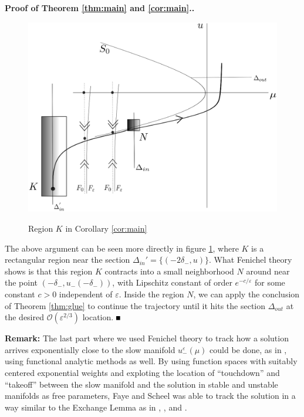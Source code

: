 \documentclass[letterpaper,11pt]{article}
\newcommand{\rmO}{\mathcal{O}}
\newcommand{\eps}{\varepsilon}
\numberwithin{equation}{section}
\theoremstyle{plain}
\newenvironment{Proof}[1][\unskip]%
 {\begin{trivlist} \item[]{\bf Proof #1. }}%
 {\hspace*{\fill}$\rule{.4\baselineskip}{.4\baselineskip}$\end{trivlist}}
\begin{document}
\begin{Proof}[\textbf{ of Theorem \ref{thm:main} and \ref{cor:main}}.]
\begin{figure}[ht]
 \centering %
 \scalebox{0.6} %
 {\includegraphics[angle = 0, origin = c]{figures/contraction_Fenichel.eps}} %
 \caption{Region $K$ in Corollary \ref{cor:main}}\label{fig:contraction_Fenichel} 
\end{figure}

The above argument can be seen more directly in figure \ref{fig:contraction_Fenichel}, where $K$ is a rectangular region near the section $\Delta_{in}'=\{(-2\delta_-,u)\}$. What Fenichel theory shows is that this region $K$ contracts into a small neighborhood $N$ around near the point $(-\delta_-, u_-(-\delta_-))$, with Lipschitz constant of order $e^{-c/\eps}$ for some constant $c>0$ independent of $\eps$. Inside the region $N$, we can apply the conclusion of Theorem \ref{thm:glue} to continue the trajectory until it hits the section $\Delta_{out}$ at the desired $\rmO(\eps^{2/3})$ location. 
\end{Proof}

\textbf{Remark:} The last part where we used Fenichel theory to track how a solution arrives exponentially close to the slow manifold $u_-^\eps(\mu)$ could be done, as in \cite{faye2015existence}, using functional analytic methods as well. By using function spaces with suitably centered exponential weights and exploting the location of ``touchdown'' and ``takeoff'' between the slow manifold and the solution in stable and unstable manifolds as free parameters, Faye and Scheel was able to track the solution in a way similar to the Exchange Lemma as in \cite{Bru_tracking}, \cite{Jones_tracking}, and \cite{Jones_exchange_lemma}.
\end{document}
